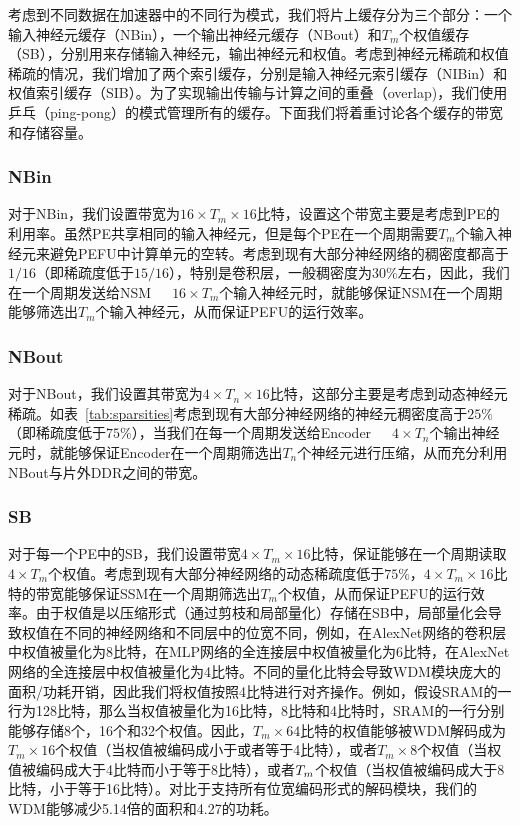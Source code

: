 考虑到不同数据在加速器中的不同行为模式，我们将片上缓存分为三个部分：一个输入神经元缓存（NBin），一个输出神经元缓存（NBout）和$T_m$个权值缓存（SB），分别用来存储输入神经元，输出神经元和权值。考虑到神经元稀疏和权值稀疏的情况，我们增加了两个索引缓存，分别是输入神经元索引缓存（NIBin）和权值索引缓存（SIB）。为了实现输出传输与计算之间的重叠（overlap)，我们使用乒乓（ping-pong）的模式管理所有的缓存。下面我们将着重讨论各个缓存的带宽和存储容量。

\subsubsection{NBin} 
对于NBin，我们设置带宽为$16\times T_m \times 16$比特，设置这个带宽主要是考虑到PE的利用率。虽然PE共享相同的输入神经元，但是每个PE在一个周期需要$T_m$个输入神经元来避免PEFU中计算单元的空转。考虑到现有大部分神经网络的稠密度都高于$1/16$（即稀疏度低于$15/16$），特别是卷积层，一般稠密度为$30\%$左右，因此，我们在一个周期发送给NSM~~~$16\times T_m$个输入神经元时，就能够保证NSM在一个周期能够筛选出$T_m$个输入神经元，从而保证PEFU的运行效率。

\subsubsection{NBout} 
对于NBout，我们设置其带宽为$4\times T_n \times 16$比特，这部分主要是考虑到动态神经元稀疏。如表~\ref{tab:sparsities}考虑到现有大部分神经网络的神经元稠密度高于$25\%$（即稀疏度低于$75\%$），当我们在每一个周期发送给Encoder~~~$4\times T_n$个输出神经元时，就能够保证Encoder在一个周期筛选出$T_n$个神经元进行压缩，从而充分利用NBout与片外DDR之间的带宽。

\subsubsection{SB}
对于每一个PE中的SB，我们设置带宽$4\times T_m\times 16$比特，保证能够在一个周期读取$4\times T_m$个权值。考虑到现有大部分神经网络的动态稀疏度低于$75\%$，$4\times T_m \times 16$比特的带宽能够保证SSM在一个周期筛选出$T_m$个权值，从而保证PEFU的运行效率。由于权值是以压缩形式（通过剪枝和局部量化）存储在SB中，局部量化会导致权值在不同的神经网络和不同层中的位宽不同，例如，在AlexNet网络的卷积层中权值被量化为8比特，在MLP网络的全连接层中权值被量化为6比特，在AlexNet网络的全连接层中权值被量化为4比特。不同的量化比特会导致WDM模块庞大的面积/功耗开销，因此我们将权值按照4比特进行对齐操作。例如，假设SRAM的一行为128比特，那么当权值被量化为16比特，8比特和4比特时，SRAM的一行分别能够存储8个，16个和32个权值。因此，$T_m \times 64$比特的权值能够被WDM解码成为$T_m \times 16$个权值（当权值被编码成小于或者等于4比特），或者$T_m \times 8$个权值（当权值被编码成大于4比特而小于等于8比特），或者$T_m \time 4$个权值（当权值被编码成大于8比特，小于等于16比特）。对比于支持所有位宽编码形式的解码模块，我们的WDM能够减少5.14倍的面积和4.27的功耗。

